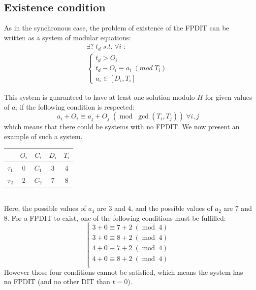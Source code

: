 \documentclass[conference]{IEEEtran}
\begin{document}
  \subsection{Existence condition}
  \label{sct:FPDITexist}
    As in the synchronous case, the problem of existence of the FPDIT
    can be written as a system of modular equations:
    \[
      \begin{array}{l}
        \exists ? \; t_d \; s.t. \; \forall i \; :\\
        \left\{
          \begin{array}{l}
            t_d > O_i \\
            t_d - O_i \equiv a_i \; (mod \; T_i) \\
            a_i \in [D_i, T_i]
          \end{array}
        \right.
      \end{array}
    \]

    This system is guaranteed to have at least one solution modulo $H$ for given
    values of $a_i$ if the following condition is respected:
    \[
      a_i + O_i \equiv a_j + O_j \; (\operatorname{mod} \; \operatorname{gcd}(T_i,
      T_j)) \; \forall i,j
    \]
    which means that there could be systems with no FPDIT.
    We now present an example of such a system.\\

    \begin{center}
    \begin{tabular}{|r|c|c|c|c|}
     \hline
      & $O_i$ & $C_i$ & $D_i$ & $T_i$ \\
     \hline
     $\tau_1$ & 0 & $C_1$ & 3 & 4\\
     \hline
     $\tau_2$ & 2 & $C_2$ & 7 & 8\\
     \hline
    \end{tabular}
    \end{center}
    ~\\

    Here, the possible values of $a_1$ are 3 and 4, and the possible values
    of $a_2$ are 7 and 8. For a FPDIT to exist, one of the following
    conditions must be fulfilled:
    \[
    \left[
    \begin{array}{c}
      3 + 0 \equiv 7 + 2 \; (\operatorname{mod} \; 4 ) \\
      3 + 0 \equiv 8 + 2 \; (\operatorname{mod} \; 4 ) \\
      4 + 0 \equiv 7 + 2 \; (\operatorname{mod} \; 4 ) \\
      4 + 0 \equiv 8 + 2 \; (\operatorname{mod} \; 4 ) \\
    \end{array}
    \right.
    \]
    However those four conditions cannot be satisfied, which means the system has
    no FPDIT (and no other DIT than $t=0$).
\end{document}
